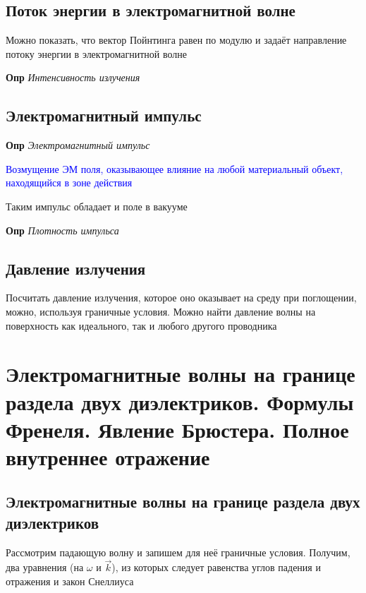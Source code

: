 \documentclass[a4paper, 14pt]{article}
\begin{document}
    \subsection{Поток энергии в электромагнитной волне}
    
    Можно показать, что вектор Пойнтинга равен по модулю и задаёт направление потоку энергии в электромагнитной волне
    
    \textbf{Опр} \textit{Интенсивность излучения}
    
    \subsection{Электромагнитный импульс}
    
    \textbf{Опр} \textit{Электромагнитный импульс}
    
    \textcolor{blue}{Возмущение ЭМ поля, оказывающее влияние на любой материальный объект, находящийся в зоне действия}
    
    Таким импульс обладает и поле в вакууме
    
    \textbf{Опр} \textit{Плотность импульса}
    
    \subsection{Давление излучения}

    
    Посчитать давление излучения, которое оно оказывает на среду при поглощении, можно, используя граничные условия.
    Можно найти давление волны на поверхность как идеального, так и любого другого проводника
    
    \section{Электромагнитные волны на границе раздела двух диэлектриков.
    Формулы Френеля.
    Явление Брюстера.
    Полное внутреннее отражение}
    
    \subsection{Электромагнитные волны на границе раздела двух диэлектриков}
    
    Рассмотрим падающую волну и запишем для неё граничные условия.
    Получим, два уравнения (на $\omega$ и $\overrightarrow{k}$), из которых следует равенства углов падения и
    отражения и закон Снеллиуса
    
\end{document}
